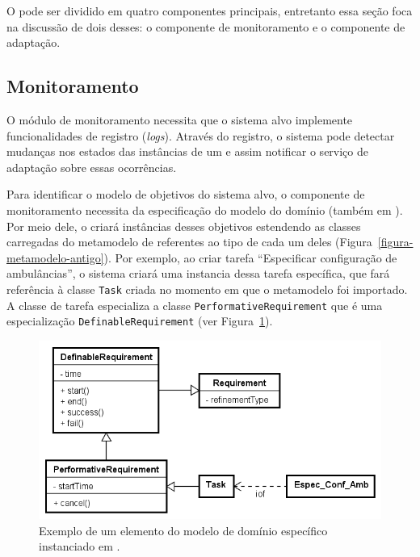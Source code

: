 O \zanshin pode ser dividido em quatro componentes principais, entretanto essa seção foca na discussão de dois desses: o componente de monitoramento e o componente de adaptação.

\subsection{Monitoramento}
\label{sec-referencial-zanshin-monitoramento}

O módulo de monitoramento necessita que o sistema alvo implemente funcionalidades de registro (\textit{logs}). Através do registro, o sistema pode detectar mudanças nos estados das instâncias de um \awreq e assim notificar o serviço de adaptação sobre essas ocorrências. 

Para identificar o modelo de objetivos do sistema alvo, o componente de monitoramento necessita da especificação do modelo do domínio (também em \ecore). Por meio dele, o \zanshin criará instâncias desses objetivos estendendo as classes carregadas do metamodelo de \gore referentes ao tipo de cada um deles (Figura~\ref{figura-metamodelo-antigo}). Por exemplo, ao criar tarefa ``Especificar configuração de ambulâncias'', o sistema criará uma instancia dessa tarefa específica, que fará referência à classe \texttt{Task} criada no momento em que o metamodelo foi importado. A classe de tarefa especializa a classe \texttt{PerformativeRequirement} que é uma especialização \texttt{DefinableRequirement} (ver Figura~\ref{exemplo-instanciacao-ecore}). 

\begin{figure}
	\centering
	\includegraphics[width=1\textwidth]{figuras/exemplos-emf/exemplo-instanciacao-ecore.PNG}
	\caption{Exemplo de um elemento do modelo de domínio específico instanciado em \zanshin.}
	\label{exemplo-instanciacao-ecore}
\end{figure}

